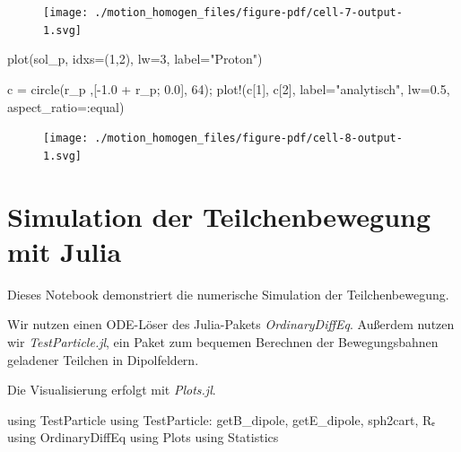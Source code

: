 \documentclass[
  a4paper,
  DIV=11]{scrreprt}
\newenvironment{Shaded}{\begin{snugshade}}{\end{snugshade}}
\newcommand{\BuiltInTok}[1]{\textcolor[rgb]{0.00,0.23,0.31}{#1}}
\newcommand{\FloatTok}[1]{\textcolor[rgb]{0.68,0.00,0.00}{#1}}
\newcommand{\FunctionTok}[1]{\textcolor[rgb]{0.28,0.35,0.67}{#1}}
\newcommand{\ImportTok}[1]{\textcolor[rgb]{0.00,0.46,0.62}{#1}}
\newcommand{\NormalTok}[1]{\textcolor[rgb]{0.00,0.23,0.31}{#1}}
\newcommand{\OperatorTok}[1]{\textcolor[rgb]{0.37,0.37,0.37}{#1}}
\newcommand{\StringTok}[1]{\textcolor[rgb]{0.13,0.47,0.30}{#1}}
\begin{document}
\begin{figure}[H]

{\centering \texttt{[image: ./motion\_homogen\_files/figure-pdf/cell-7-output-1.svg]}

}

\end{figure}

\begin{Shaded}
\begin{Highlighting}[]
\FunctionTok{plot}\NormalTok{(sol\_p, idxs}\OperatorTok{=}\NormalTok{(}\FloatTok{1}\NormalTok{,}\FloatTok{2}\NormalTok{), lw}\OperatorTok{=}\FloatTok{3}\NormalTok{, label}\OperatorTok{=}\StringTok{"Proton"}\NormalTok{)}

\NormalTok{c }\OperatorTok{=} \FunctionTok{circle}\NormalTok{(r\_p ,[}\OperatorTok{{-}}\FloatTok{1.0} \OperatorTok{+}\NormalTok{ r\_p; }\FloatTok{0.0}\NormalTok{], }\FloatTok{64}\NormalTok{);}
\FunctionTok{plot!}\NormalTok{(c[}\FloatTok{1}\NormalTok{], c[}\FloatTok{2}\NormalTok{], label}\OperatorTok{=}\StringTok{"analytisch"}\NormalTok{, lw}\OperatorTok{=}\FloatTok{0.5}\NormalTok{, aspect\_ratio}\OperatorTok{=:}\NormalTok{equal)}
\end{Highlighting}
\end{Shaded}

\begin{figure}[H]

{\centering \texttt{[image: ./motion\_homogen\_files/figure-pdf/cell-8-output-1.svg]}

}

\end{figure}

\hypertarget{simulation-der-teilchenbewegung-mit-julia}{%
\chapter{Simulation der Teilchenbewegung mit
Julia}\label{simulation-der-teilchenbewegung-mit-julia}}

Dieses Notebook demonstriert die numerische Simulation der
Teilchenbewegung.

Wir nutzen einen ODE-Löser des Julia-Pakets \emph{OrdinaryDiffEq}.
Außerdem nutzen wir \emph{TestParticle.jl}, ein Paket zum bequemen
Berechnen der Bewegungsbahnen geladener Teilchen in Dipolfeldern.

Die Visualisierung erfolgt mit \emph{Plots.jl}.

\begin{Shaded}
\begin{Highlighting}[]
\ImportTok{using} \BuiltInTok{TestParticle}
\ImportTok{using} \BuiltInTok{TestParticle}\NormalTok{: getB\_dipole, getE\_dipole, sph2cart, Rₑ}
\ImportTok{using} \BuiltInTok{OrdinaryDiffEq}
\ImportTok{using} \BuiltInTok{Plots}
\ImportTok{using} \BuiltInTok{Statistics}
\end{Highlighting}
\end{Shaded}
\end{document}
